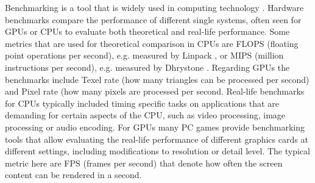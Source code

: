 Benchmarking is a tool that is widely used in computing technology \cite{lewis1985evolution}. Hardware benchmarks compare the performance of different single systems, often seen for GPUs or CPUs to evaluate both theoretical and real-life performance. Some metrics that are used for theoretical comparison in CPUs are FLOPS (floating point operations per second), e.g. measured by Linpack \cite{dongarra2003linpack}, or MIPS (million instructions per second), e.g. measured by Dhrystone \cite{weicker1984dhrystone}. Regarding GPUs the benchmarks include Texel rate (how many triangles can be processed per second) and Pixel rate (how many pixels are processed per second. Real-life benchmarks for CPUs typically included timing specific tasks on applications that are demanding for certain aspects of the CPU, such as video processing, image processing or audio encoding. For GPUs many PC games provide benchmarking tools that allow evaluating the real-life performance of different graphics cards at different settings, including modifications to resolution or detail level. The typical metric here are FPS (frames per second) that denote how often the screen content can be rendered in a second.

